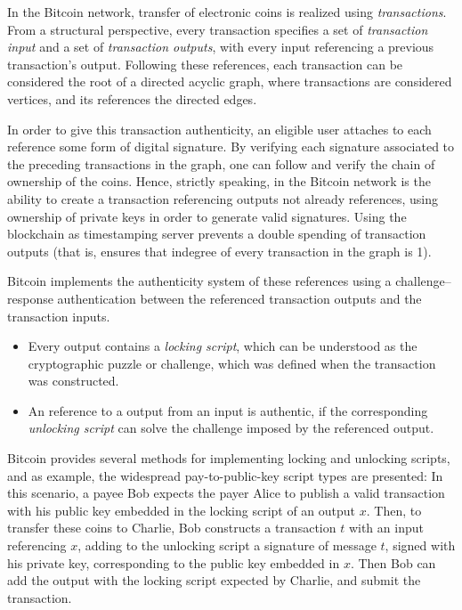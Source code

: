 \documentclass[a4paper,11pt,titlepage]{scrbook}
\begin{document}
In the Bitcoin network, transfer of electronic coins is realized using \emph{transactions}.
From a structural perspective, every transaction specifies a set of \emph{transaction input} and a set of \emph{transaction outputs}, with every input referencing a previous transaction's output.
Following these references, each transaction can be considered the root of a directed acyclic graph, where transactions are considered vertices, and its references the directed edges.

In order to give this transaction authenticity, an eligible user attaches to each reference some form of digital signature.
By verifying each signature associated to the preceding transactions in the graph, one can follow and verify the chain of ownership of the coins.
Hence, strictly speaking,  in the Bitcoin network is the ability to create a transaction referencing outputs not already references, using ownership of private keys in order to generate valid signatures.
Using the blockchain as timestamping server prevents a double spending of transaction outputs (that is, ensures that indegree of every transaction in the graph is 1).

Bitcoin implements the authenticity system of these references using a challenge–response authentication between the referenced transaction outputs and the transaction inputs.

\begin{itemize}
    \item Every output contains a \emph{locking script}, which can be understood as the cryptographic puzzle or challenge, which was defined when the transaction was constructed.
    \item An reference to a output from an input is authentic, if the corresponding \emph{unlocking script} can solve the challenge imposed by the referenced output.
\end{itemize}

Bitcoin provides several methods for implementing locking and unlocking scripts, and as example, the widespread pay-to-public-key script types are presented: In this scenario, a payee Bob expects the payer Alice to publish a valid transaction with his public key embedded in the locking script of an output $x$.
Then, to transfer these coins to Charlie, Bob constructs a transaction $t$ with an input referencing $x$, adding to the unlocking script a signature of message $t$, signed with his private key, corresponding to the public key embedded in $x$.
Then Bob can add the output with the locking script expected by Charlie, and submit the transaction. \cite[Cf. chap.~6--7]{antonopoulos_mastering_2017}
\end{document}
